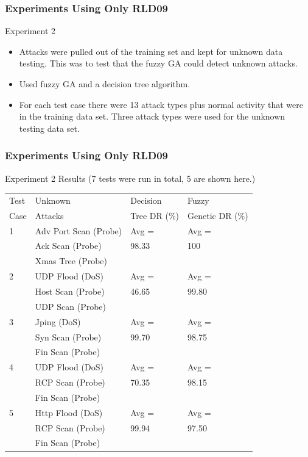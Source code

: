 \documentclass{beamer}
\begin{document}
\begin{frame}
	\frametitle{Experiments Using Only RLD09}
Experiment 2
	\begin{itemize}
		\item Attacks were pulled out of the training set and kept for unknown data testing. This was to test that the fuzzy GA could detect unknown attacks.
		\item Used fuzzy GA and a decision tree algorithm.
		\item For each test case there were 13 attack types plus normal activity that were in the training data set. Three attack types were used for the unknown testing data set.
	\end{itemize}
\end{frame}


\begin{frame}
	\frametitle{Experiments Using Only RLD09}
	Experiment 2 Results (7 tests were run in total, 5 are shown here.)
	
\begin{table}
\begin{footnotesize}
\begin{tabular}{llll}
Test & Unknown & Decision & Fuzzy\\
Case & Attacks & Tree DR (\%) & Genetic DR (\%)\\ \hline

1 & Adv Port Scan (Probe) & Avg = & Avg =\\
  & Ack Scan (Probe)                 & 98.33 & 100\\
  & Xmas Tree (Probe)                 &                 &\\ \hline

2 & UDP Flood (DoS) & Avg = & Avg =\\
  & Host Scan (Probe) & 46.65 & 99.80\\
  & UDP Scan (Probe) & &\\ \hline

3 & Jping (DoS) & Avg = & Avg =\\
  & Syn Scan (Probe) & 99.70 & 98.75\\
  & Fin Scan (Probe) & &\\ \hline

4 & UDP Flood (DoS) & Avg = & Avg =\\
  & RCP Scan (Probe) & 70.35 & 98.15\\
  & Fin Scan (Probe) & &\\ \hline

5 & Http Flood (DoS) & Avg = & Avg =\\
  & RCP Scan (Probe) & 99.94 & 97.50\\
  & Fin Scan (Probe) & &\\
\hline\end{tabular}
\end{footnotesize}
\end{table}
	
\end{frame}
\end{document}
